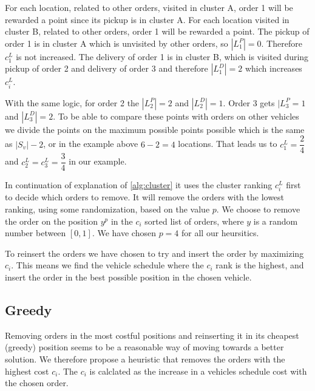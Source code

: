 \documentclass[../main.tex]{subfiles}
\begin{document}
For each location, related to other orders, visited in cluster A, order 1 will be rewarded a point since its pickup is in cluster A. 
For each location visited in cluster B, related to other orders, order 1 will be rewarded a point.
The pickup of order 1 is in cluster A which is unvisited by other orders, so $|L^P_{1}| = 0$.
Therefore  $c^L_1$ is not increased.
The delivery of order 1 is in cluster B, which is visited during pickup of order 2 and delivery of order 3 and therefore $|L^D_{1}|=2$ which increases $c^L_i$. \par
With the same logic, for order 2 the $|L^P_{2}|=2$ and $|L^D_{2}| = 1$.
Order 3 gets $|L^P_{3}=1$ and $|L^D_3| = 2$.
To be able to compare these points with orders on other vehicles we divide the points on the maximum possible points possible which is the same as $|S_v|-2$, or in the example above $6-2 = 4$ locations. 
That leads us to $c^L_1 = \dfrac{2}{4}$ and $c^L_2 = c^L_3 = \dfrac{3}{4}$ in our example. \par

In continuation of explanation of \cref{alg:cluster} it uses the cluster ranking $c^L_i$ first to decide which orders to remove.
It will remove the orders with the lowest ranking, using some randomization, based on the value $p$. 
We choose to remove the order on the position $y^p$ in the $c_i$ sorted list of orders, where $y$ is a random number between $[0,1]$. We have chosen $p=4$ for all our heursitics.  \newline \par
To reinsert the orders we have chosen to try and insert the order by maximizing $c_i$. This means we find the vehicle schedule where the $c_i$ rank is the highest, and insert the order in the best possible position in the chosen vehicle. 

\subsection{Greedy}
\label{sec:greedy}
Removing orders in the most costful positions and reinserting it in its cheapest (greedy) position seems to be a reasonable way of moving towards a better solution.
We therefore propose a heuristic that removes the orders with the highest cost $c_{i}$.
The $c_i$ is calclated as the increase in a vehicles schedule cost with the chosen order.
\end{document}
